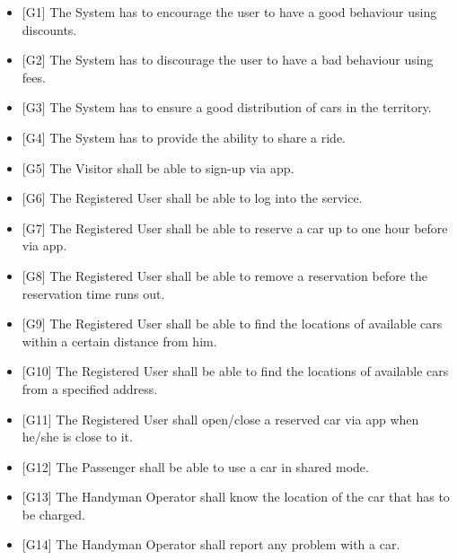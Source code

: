 \newcommand{\gSystemDiscounts}{{[}G1{]} The System has to encourage the user to have a good behaviour using discounts.}
\newcommand{\gSystemFees}{{[}G2{]} The System has to discourage the user to have a bad behaviour using fees.}
\newcommand{\gSystemDistribution}{{[}G3{]} The System has to ensure a good distribution of cars in the territory.}
\newcommand{\gSystemShare}{{[}G4{]} The System has to provide the ability to share a ride.}
\newcommand{\gVisitorSignUp}{{[}G5{]} The Visitor shall be able to sign-up via app.}
\newcommand{\gRegisteredLogin}{{[}G6{]} The Registered User shall be able to log into the service.}
\newcommand{\gRegisteredReserve}{{[}G7{]} The Registered User shall be able to reserve a car up to one hour before via app.}
\newcommand{\gRegisteredDeleteReservation}{{[}G8{]} The Registered User shall be able to remove a reservation before the reservation time runs out.}
\newcommand{\gRegisteredSearchDistance}{{[}G9{]} The Registered User shall be able to find the locations of available cars within a certain distance from him.}
\newcommand{\gRegisteredSearchAddress}{{[}G10{]} The Registered User shall be able to find the locations of available cars from a specified address.}
\newcommand{\gRegisteredLockUnlock}{{[}G11{]} The Registered User shall open/close a reserved car via app when he/she is close to it.}
\newcommand{\gPassengerShare}{{[}G12{]} The Passenger shall be able to use a car in shared mode.}
\newcommand{\gHandymanRecharge}{{[}G13{]} The Handyman Operator shall know the location of the car that has to be charged.}
\newcommand{\gHandymanReportIssue}{{[}G14{]} The Handyman Operator shall report any problem with a car.}

\begin{itemize}
	\item \gSystemDiscounts
	\item \gSystemFees
	\item \gSystemDistribution
	\item \gSystemShare
	\item \gVisitorSignUp
	\item \gRegisteredLogin
	\item \gRegisteredReserve
	\item \gRegisteredDeleteReservation
	\item \gRegisteredSearchDistance
	\item \gRegisteredSearchAddress
	\item \gRegisteredLockUnlock
	\item \gPassengerShare	
	\item \gHandymanRecharge
	\item \gHandymanReportIssue
\end{itemize}